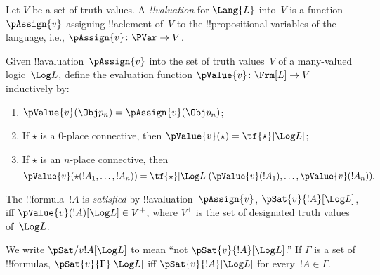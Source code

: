 \documentclass[../../../include/open-logic-section]{subfiles}
\begin{document}

\begin{defn}[!!^{valuation}s] 
Let $V$ be a set of truth values. A \emph{!!{valuation}} for
$\Lang{L}$ into~$V$ is a
function~$\pAssign{v}$ assigning !!a{element} of~$V$ to the
!!{propositional variable}s of the language, i.e., $\pAssign{v} \colon
\PVar \to V$.
\end{defn}

\begin{defn}
  Given !!a{valuation}~$\pAssign{v}$ into the set of truth values~$V$ of a
  many-valued logic~$\Log L$, define the evaluation function
  $\pValue{v} \colon \Frm[L] \to V$ inductively by:
  \begin{enumerate}
    \item $\pValue{v}(\Obj p_n) = \pAssign{v}(\Obj p_n)$; 
    \item If $\star$ is a $0$-place connective, then $\pValue{v}(\star)  = \tf{\star}[\Log L]$;
    \item If $\star$ is an $n$-place connective, then 
    \[
      \pValue{v}(\star(!A_1, \dots, !A_n)) = \tf{\star}[\Log L]
      (\pValue{v}(!A_1), \dots, \pValue{v}(!A_n)).
    \]
  \end{enumerate}
\end{defn}

\begin{defn}[Satisfaction]
 The !!{formula}~$!A$ is \emph{satisfied}
  by !!a{valuation}~$\pAssign{v}$, $\pSat{v}{!A}[\Log L]$, iff
  $\pValue{v}(!A)[\Log L] \in V^+$, where $V^+$ is the set of
  designated truth values of~$\Log L$. 
  
  We write $\pSat/{v}{!A}[\Log L]$ to mean ``not $\pSat{v}{!A}[\Log
  L]$.'' If $\Gamma$ is a set of !!{formula}s, $\pSat{v}{\Gamma}[\Log
  L]$ iff $\pSat{v}{!A}[\Log L]$ for every~$!A \in \Gamma$.
\end{defn}
\end{document}
